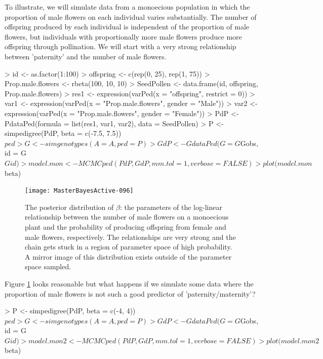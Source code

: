 \documentclass{article}
\begin{document}
  To illustrate, we will simulate data from a monoecious population in which the proportion of male flowers on each individual varies substantially. The number of offspring produced by each individual is independent of the proportion of male flowers, but individuals with proportionally more male flowers produce more offspring through pollination.  We will start with a very strong relationship between 'paternity' and the number of male flowers.
 
\begin{Schunk}
\begin{Sinput}
> id <- as.factor(1:100)
> offspring <- c(rep(0, 25), rep(1, 75))
> Prop.male.flowers <- rbeta(100, 10, 10)
> SeedPollen <- data.frame(id, offspring, Prop.male.flowers)
> res1 <- expression(varPed(x = "offspring", restrict = 0))
> var1 <- expression(varPed(x = "Prop.male.flowers", gender = "Male"))
> var2 <- expression(varPed(x = "Prop.male.flowers", gender = "Female"))
> PdP <- PdataPed(formula = list(res1, var1, var2), data = SeedPollen)
> P <- simpedigree(PdP, beta = c(-7.5, 7.5))$ped
> G <- simgenotypes(A = A, ped = P)
> GdP <- GdataPed(G = G$Gobs, id = G$Gid)
> model.mon <- MCMCped(PdP, GdP, mm.tol = 1, verbose = FALSE)
> plot(model.mon$beta)
\end{Sinput}
\end{Schunk}


\begin{figure}[!h]
\begin{center}
\texttt{[image: MasterBayesActive-096]}
\end{center}
\caption{The posterior distribution of $\beta$: the parameters of the log-linear relationship between the number of male flowers on a monoecious plant and the probability of producing offspring from female and male flowers, respectively. The relationships are very strong and the chain gets stuck in a region of parameter space of high probability.  A mirror image of this distribution exists outside of the parameter space sampled.}
\label{mon1-fig}
\end{figure}


Figure \ref{mon1-fig} looks reasonable but what happens if we simulate some data where the proportion of male flowers is not such a good predictor of 'paternity/maternity'?  

\begin{Schunk}
\begin{Sinput}
> P <- simpedigree(PdP, beta = c(-4, 4))$ped
> G <- simgenotypes(A = A, ped = P)
> GdP <- GdataPed(G = G$Gobs, id = G$Gid)
> model.mon2 <- MCMCped(PdP, GdP, mm.tol = 1, verbose = FALSE)
> plot(model.mon2$beta)
\end{Sinput}
\end{Schunk}
\end{document}
